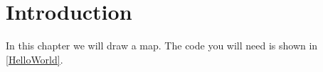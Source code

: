 \chapter{Introduction}\label{introduction}
In this chapter we will draw a map. The code you will need is shown in \cref{HelloWorld}.



